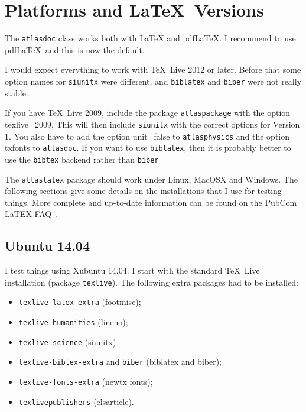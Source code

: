 \documentclass[atlasstyle,UKenglish]{latex/atlasdoc}
\newcommand{\Option}[1]{\textsf{#1}\xspace}
\newcommand{\Package}[1]{\texttt{#1}\xspace}
\begin{document}
\section{Platforms and \LaTeX\ Versions}
\label{sec:version}

The \Package{atlasdoc} class works both with \LaTeX{} and pdf\LaTeX{}.
I recommend to use pdf\LaTeX\ and this is now the default.

I would expect everything to work with \TeX\ Live 2012 or later.
Before that some option names for \Package{siunitx} were different, 
 and \Package{biblatex} and \Package{biber} were not really stable.

If you have \TeX\ Live 2009, include the package \Package{atlaspackage} with the option
\Option{texlive=2009}.
This will then include \Package{siunitx} with the correct options for Version 1.
You also have to add the option \Option{unit=false} to \Package{atlasphysics}
and the option \Option{txfonts} to \Package{atlasdoc}.
If you want to use \Package{biblatex},
then it is probably better to use the \Package{bibtex} backend rather than \Package{biber}

The \Package{atlaslatex} package should work under Linux, MacOSX and Windows.
The following sections give some details on the installations that I use for testing things.
More complete and up-to-date information can be found on the PubCom LaTEX FAQ~\cite{latex-faq}.


\subsection{Ubuntu 14.04}

I test things using Xubuntu 14.04.
I start with the standard \TeX\ Live installation (package \texttt{texlive}).
The following extra packages had to be installed:
\begin{itemize}\setlength{\parskip}{0pt}\setlength{\itemsep}{0pt}
\item \Package{texlive-latex-extra} (footmisc);
\item \Package{texlive-humanities} (lineno);
\item \Package{texlive-science} (siunitx)
\item \Package{texlive-bibtex-extra} and \Package{biber} (biblatex and biber);
\item \Package{texlive-fonts-extra} (newtx fonts);
\item \Package{texlivepublishers} (elsarticle).
\end{itemize}
\end{document}
